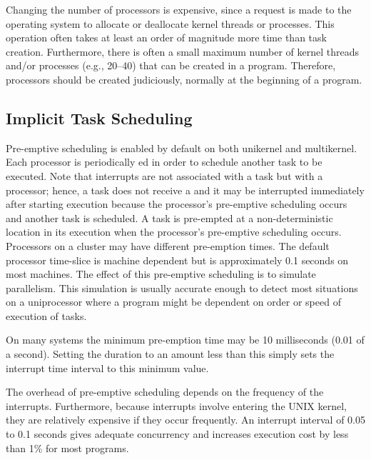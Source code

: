 \documentclass[openright,twoside]{report}
\begin{document}
\begin{annotation}
Changing the number of processors is expensive, since a request is made to the operating system to allocate or deallocate kernel threads or processes.
This operation often takes at least an order of magnitude more time than task creation.
Furthermore, there is often a small maximum number of kernel threads and/or processes (e.g., 20--40) that can be created in a program.
Therefore, processors should be created judiciously, normally at the beginning of a program.
\end{annotation}


\subsection{Implicit Task Scheduling}
\label{s:ImplicitTaskScheduling}

Pre-emptive scheduling is enabled by default on both unikernel and multikernel.
Each processor is periodically ed in order to schedule another task to be executed.
Note that interrupts are not associated with a task but with a processor;
hence, a task does not receive a  and it may be interrupted immediately after starting execution because the processor's pre-emptive scheduling occurs and another task is scheduled.
A task is pre-empted at a non-deterministic location in its execution when the processor's pre-emptive scheduling occurs.
Processors on a cluster may have different pre-emption times.
The default processor time-slice is machine dependent but is approximately 0.1 seconds on most machines.
The effect of this pre-emptive scheduling is to simulate parallelism.
This simulation is usually accurate enough to detect most situations on a uniprocessor where a program might be dependent on order or speed of execution of tasks.

\begin{annotation}
On many systems the minimum pre-emption time may be 10 milliseconds (0.01 of a second).
Setting the duration to an amount less than this simply sets the interrupt time interval to this minimum value.
\end{annotation}

\begin{annotation}
The overhead of pre-emptive scheduling depends on the frequency of the interrupts.
Furthermore, because interrupts involve entering the UNIX kernel, they are relatively expensive if they occur frequently.
An interrupt interval of 0.05 to 0.1 seconds gives adequate concurrency and increases execution cost by less than 1\% for most programs.
\end{annotation}
\end{document}
